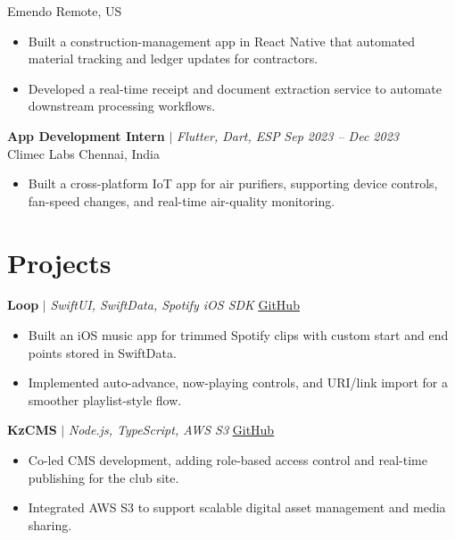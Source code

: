 \documentclass[a4paper,11pt]{article}
\newcommand{\resumeItem}[1]{
  \item\small{
    {#1 \vspace{-2pt}}
  }
}
\newcommand{\resumeItemListStart}{\begin{itemize}[leftmargin=0.2in, topsep=0pt, partopsep=0pt]}
\newcommand{\resumeItemListEnd}{\end{itemize}\vspace{-5pt}}
\begin{document}
\begin{itemize}[leftmargin=0.15in, label={}]
{{            {Emendo \hfill Remote, US}
            \resumeItemListStart
                \resumeItem{Built a construction-management app in React Native that automated material tracking and ledger updates for contractors.}
                \resumeItem{Developed a real-time receipt and document extraction service to automate downstream processing workflows.}
            \resumeItemListEnd
        }
    }
    \small{
        \item{
            {\textbf{App Development Intern} $|$ \emph{Flutter, Dart, ESP} \hfill \emph{Sep 2023 -- Dec 2023}}\\
            {Climec Labs \hfill Chennai, India}
            \resumeItemListStart
                \resumeItem{Built a cross-platform IoT app for air purifiers, supporting device controls, fan-speed changes, and real-time air-quality monitoring.}
            \resumeItemListEnd
        }
    }
\end{itemize}

\section{Projects}
\begin{itemize}[leftmargin=0.15in, label={}]
    \small{
        \item{
             {\textbf{Loop} $|$ \emph{SwiftUI, SwiftData, Spotify iOS SDK} \hfill \underline{\href{https://github.com/jatindotdev/loop}{GitHub}}}
             \resumeItemListStart
                \resumeItem{Built an iOS music app for trimmed Spotify clips with custom start and end points stored in SwiftData.}
                \resumeItem{Implemented auto-advance, now-playing controls, and URI/link import for a smoother playlist-style flow.}
             \resumeItemListEnd
        }
    }
    \small{
        \item{
             {\textbf{KzCMS} $|$ \emph{Node.js, TypeScript, AWS S3} \hfill \underline{\href{https://github.com/srm-kzilla/kzcms}{GitHub}}}
             \resumeItemListStart
                \resumeItem{Co-led CMS development, adding role-based access control and real-time publishing for the club site.}
                \resumeItem{Integrated AWS S3 to support scalable digital asset management and media sharing.}
             \resumeItemListEnd
        }
    }
\end{itemize}
\end{document}
